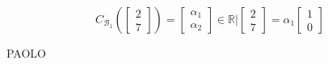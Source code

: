 \[
    C_{\mathcal{B}_1}( 
    \begin{bmatrix}  
        2\\7
    \end{bmatrix}  
    )
    = 
    \begin{bmatrix}
        \alpha_1\\
        \alpha_2
    \end{bmatrix}
    \in\mathbb{R}\Big| 
    \begin{bmatrix}
        2\\7
    \end{bmatrix}
    =\alpha_1
    \begin{bmatrix}
        1\\0
    \end{bmatrix}
\]

PAOLO







    





